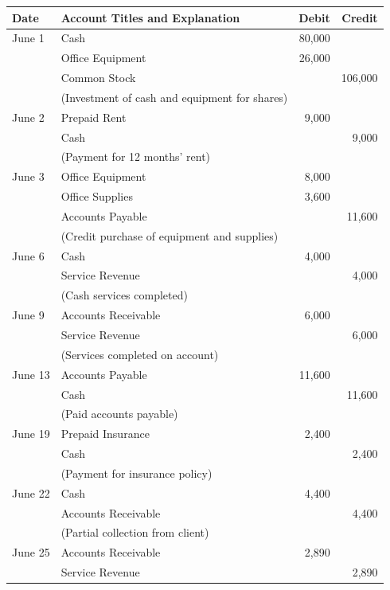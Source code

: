 \documentclass[12pt,a4paper]{book}
\begin{document}
\begin{center}
\begin{tabular}{|l|l|r|r|}
\hline
\textbf{Date} & \textbf{Account Titles and Explanation} & \textbf{Debit} & \textbf{Credit} \\
\hline
June 1 & Cash & 80,000 & \\
       & Office Equipment & 26,000 & \\
       & \quad Common Stock & & 106,000 \\
       & (Investment of cash and equipment for shares) & & \\
\hline
June 2 & Prepaid Rent & 9,000 & \\
       & \quad Cash & & 9,000 \\
       & (Payment for 12 months' rent) & & \\
\hline
June 3 & Office Equipment & 8,000 & \\
       & Office Supplies & 3,600 & \\
       & \quad Accounts Payable & & 11,600 \\
       & (Credit purchase of equipment and supplies) & & \\
\hline
June 6 & Cash & 4,000 & \\
       & \quad Service Revenue & & 4,000 \\
       & (Cash services completed) & & \\
\hline
June 9 & Accounts Receivable & 6,000 & \\
       & \quad Service Revenue & & 6,000 \\
       & (Services completed on account) & & \\
\hline
June 13 & Accounts Payable & 11,600 & \\
        & \quad Cash & & 11,600 \\
        & (Paid accounts payable) & & \\
\hline
June 19 & Prepaid Insurance & 2,400 & \\
        & \quad Cash & & 2,400 \\
        & (Payment for insurance policy) & & \\
\hline
June 22 & Cash & 4,400 & \\
        & \quad Accounts Receivable & & 4,400 \\
        & (Partial collection from client) & & \\
\hline
June 25 & Accounts Receivable & 2,890 & \\
        & \quad Service Revenue & & 2,890 \\

\end{tabular}
\end{center}
\end{document}
